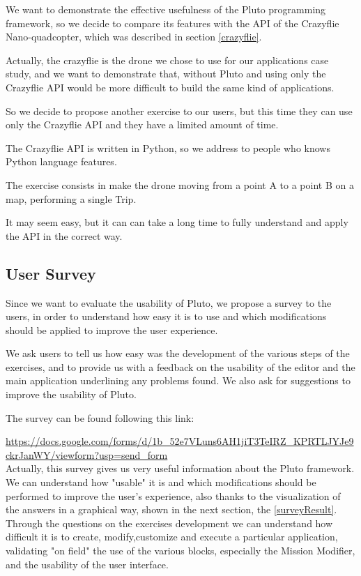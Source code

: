 We want to demonstrate the effective usefulness of the Pluto programming framework, so we decide to compare its features with the API of the Crazyflie Nano-quadcopter, which was described in section \ref{crazyflie}.

Actually, the crazyflie is the drone we chose to use for our applications case study, and we want to demonstrate that, without Pluto and using only the Crazyflie API would be more difficult to build the same kind of applications.

So we decide to propose another exercise to our users, but this time they can use only the Crazyflie API and they have a limited amount of time.

The Crazyflie API is written in Python, so we address to people who knows Python language features.

The exercise consists in make the drone moving from a point A to a point B on a map, performing a single Trip.

It may seem easy, but it can can take a long time to fully understand and apply the API in the correct way.


\subsection{User Survey}\label{survey}

Since we want to evaluate the usability of Pluto, we propose a survey to the users, in order to understand how easy it is to use and which modifications should be applied to improve the user experience.

We ask users to tell us how easy was the development of the various steps of the exercises, and to provide us with a feedback on the usability of the editor and the main application underlining any problems found.
We also ask for suggestions to improve the usability of Pluto.

The survey can be found following this link:

\url{https://docs.google.com/forms/d/1b_52e7VLuns6AH1jiT3TeIRZ_KPRTLJYJe9ckrJanWY/viewform?usp=send_form}
\\

Actually, this survey gives us very useful information about the Pluto framework. We can understand how "usable" it is and which modifications should be performed to improve the user's experience, also thanks to the visualization of the answers in a graphical way, shown in the next section, the \ref{surveyResult}.
Through the questions on the exercises development we can understand how difficult it is to create, modify,customize and execute a particular application, validating "on field" the use of the various blocks, especially the Mission Modifier, and the usability of the user interface.

